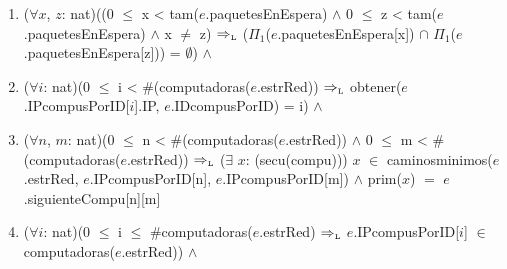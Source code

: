 \begin{Representacion}
{\begin{enumerate}
			($\forall$ $t$: tupla(prioridad,ItConj(paquete))) $t$ $\in$ colaAConj($\Pi_3$($e$.paquetesEnEspera[$L$])) $\Rightarrow$ siguiente($\Pi_2$($t$)).prioridad = $\Pi_1$($t$) \\

    ($\forall$ $it_{1}$: ItConj(paquete)) ($\forall$ $it_{2}$: ItConj(paquete)) $it_{1}$ $\in$ dame$\Pi_{2}$(colaAConj($\Pi_{3}$($e$.paquetesEnEspera[$L$]))) $\land$ $it_{2}$ $\in$ dame$\Pi_{2}$(colaAConj($\Pi_{3}$($e$.paquetesEnEspera[$L$]))) $it_{1}$ $\neq$ $it_{2}$ $\impluego$ siguiente($it_{1}$) $\neq$ siguiente($it_{2}$) \\

    \#($\Pi_1$($e$.paquetesEnEspera[L])) = \#claves($\Pi_2$($e$.paquetesEnEspera[L])) $\land$ = \#colaAConj($\Pi_3$($e$.paquetesEnEspera[L])) \\

    ($\forall c$:ID) $c \in$ claves($\Pi_2$($e$.paquetesEnEspera) $\impluego$ obtener(siguiente($\Pi_1$(obtener($c$, $\Pi_2$($e$.paquetesEnEspera))).origen, $e$.IDsCompusPorIP) = $\Pi_2$(obtener($c$, $\Pi_2$($e$.paquetesEnEspera)))) $\land$ obtener(siguiente($\Pi_1$(obtener($c$, $\Pi_2$($e$.paquetesEnEspera))).destino, $e$.IDsCompusPorIP) = $\Pi_3$(obtener($c$, $\Pi_2$($e$.paquetesEnEspera))))
\item     ($\forall x$, $z$: nat)((0 $\leq$ x < tam($e$.paquetesEnEspera) $\land$ 0 $\leq$ z < tam($e$.paquetesEnEspera) $\land$ x $\neq$ z) $\impluego$ ($\Pi_1$($e$.paquetesEnEspera[x]) $\cap$ $\Pi_1$($e$.paquetesEnEspera[z])) = $\emptyset$) $\land$ 

\item	($\forall i$: nat)(0 $\leq$ i < \#(computadoras($e$.estrRed)) $\impluego$ obtener($e$.IPcompusPorID[$i$].IP, $e$.IDcompusPorID) = i) $\land$ \\

\item	($\forall n$, $m$: nat)(0 $\leq$ n < \#(computadoras($e$.estrRed)) $\land$ 0 $\leq$ m < \#(computadoras($e$.estrRed)) $\impluego$ ($\exists$ $x$: (secu(compu))) $x$ $\in$ caminosminimos($e$.estrRed, $e$.IPcompusPorID[n], $e$.IPcompusPorID[m]) $\land$ prim($x$) $=$ $e$.siguienteCompu[n][m] \\

\item    ($\forall i$: nat)(0 $\leq$ i $\leq$ \#computadoras($e$.estrRed) $\impluego$ $e$.IPcompusPorID[$i$] $\in$ computadoras($e$.estrRed)) $\land$ \\


\end{enumerate}}
\end{Representacion}
